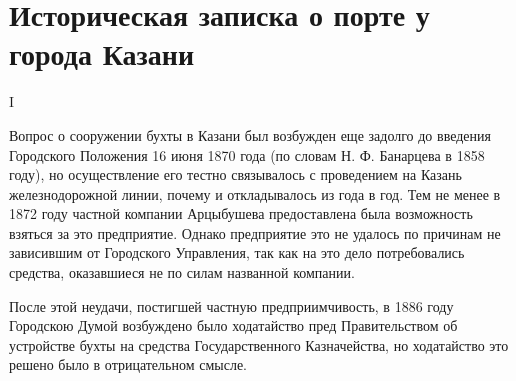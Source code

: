 \documentclass[oneside,final,14pt]{extreport}
\begin{document}
\section*{Историческая записка о порте у города Казани}


\begin{center}
	I
\end{center}

Вопрос о сооружении бухты в Казани был возбужден еще задолго до введения Городского Положения 16 июня 1870 года (по словам Н. Ф. Банарцева в 1858 году), но осуществление его тестно связывалось с проведением на Казань железнодорожной линии, почему и откладывалось из года в год. Тем не менее в 1872 году частной компании Арцыбушева предоставлена была возможность взяться за это предприятие. Однако предприятие это не удалось по причинам не зависившим от Городского Управления, так как на это дело потребовались средства, оказавшиеся не по силам названной компании.

После этой неудачи, постигшей частную предприимчивость, в 1886 году Городскою Думой возбуждено было ходатайство пред Правительством об устройстве бухты на средства Государственного Казначейства, но ходатайство это решено было в отрицательном смысле.
\end{document}
